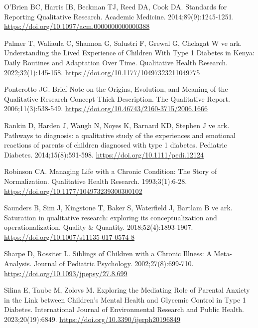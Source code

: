 \documentclass[
  turkish,
  a4paper,
  DIV=11,
  numbers=noendperiod]{scrreprt}
\newlength{\cslhangindent}
\newenvironment{CSLReferences}[2] %
 {\begin{list}{}{%
  \setlength{\itemindent}{0pt}
  \setlength{\leftmargin}{0pt}
  \setlength{\parsep}{0pt}
  \ifodd #1
   \setlength{\leftmargin}{\cslhangindent}
   \setlength{\itemindent}{-1\cslhangindent}
  \fi
  \setlength{\itemsep}{#2\baselineskip}}}
 {\end{list}}
\begin{document}
\begin{CSLReferences}{1}{0}
O'Brien BC, Harris IB, Beckman TJ, Reed DA, Cook DA. Standards for
{Reporting} {Qualitative} {Research}. Academic Medicine.
2014;89(9):1245-1251. \url{https://doi.org/10.1097/acm.0000000000000388}

Palmer T, Waliaula C, Shannon G, Salustri F, Grewal G, Chelagat W ve
ark. Understanding the Lived Experience of Children With Type 1 Diabetes
in Kenya: Daily Routines and Adaptation Over Time. Qualitative Health
Research. 2022;32(1):145-158.
\url{https://doi.org/10.1177/10497323211049775}

Ponterotto JG. Brief Note on the Origins, Evolution, and Meaning of the
Qualitative Research Concept Thick Description. The Qualitative Report.
2006;11(3):538-549. \url{https://doi.org/10.46743/2160-3715/2006.1666}

Rankin D, Harden J, Waugh N, Noyes K, Barnard KD, Stephen J ve ark.
Pathways to diagnosis: a qualitative study of the experiences and
emotional reactions of parents of children diagnosed with type 1
diabetes. Pediatric Diabetes. 2014;15(8):591-598.
\url{https://doi.org/10.1111/pedi.12124}

Robinson CA. Managing Life with a Chronic Condition: The Story of
Normalization. Qualitative Health Research. 1993;3(1):6-28.
\url{https://doi.org/10.1177/104973239300300102}

Saunders B, Sim J, Kingstone T, Baker S, Waterfield J, Bartlam B ve ark.
Saturation in qualitative research: exploring its conceptualization and
operationalization. Quality \& Quantity. 2018;52(4):1893-1907.
\url{https://doi.org/10.1007/s11135-017-0574-8}

Sharpe D, Rossiter L. Siblings of Children with a Chronic Illness: A
Meta-Analysis. Journal of Pediatric Psychology. 2002;27(8):699-710.
\url{https://doi.org/10.1093/jpepsy/27.8.699}

Silina E, Taube M, Zolovs M. Exploring the Mediating Role of Parental
Anxiety in the Link between Children's Mental Health and Glycemic
Control in Type 1 Diabetes. International Journal of Environmental
Research and Public Health. 2023;20(19):6849.
\url{https://doi.org/10.3390/ijerph20196849}


\end{CSLReferences}
\end{document}
